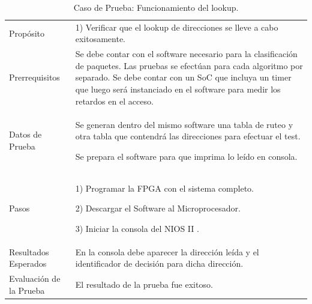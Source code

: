\begin{table}
	\begin{tabular}{|>{\columncolor[gray]{0.8}}l|p{11cm}|} \hline
\multicolumn{2}{|>{\columncolor[gray]{0.8}}l|}{\textbf{Caso de Prueba: Funcionamiento del LookUp }}\\ \hline
Propósito  & 1) Verificar que el lookup de direcciones se lleve a cabo exitosamente. 

\\ \hline
 Prerrequisitos  & Se debe contar con el software necesario para la clasificación de paquetes. Las pruebas se efectúan para cada algoritmo por separado. Se debe contar con un SoC que incluya un timer que luego será instanciado en el software para medir los retardos en el acceso.
 \\ \hline
 Datos de Prueba & Se generan dentro del mismo software una tabla de ruteo y otra tabla que contendrá las direcciones para efectuar el test. 

Se prepara el software para que imprima lo leído en consola. 
 \\ \hline
 Pasos & 1) Programar la FPGA con el sistema completo.

2) Descargar el Software al Microprocesador. 

3) Iniciar la consola del NIOS II .
\\ \hline
 Resultados Esperados & En la consola debe aparecer la dirección leída y el identificador de decisión para dicha dirección. \\ \hline
 Evaluación de la Prueba  & El resultado de la prueba fue exitoso.\\ \hline
	\end{tabular}
	\caption{Caso de Prueba: Funcionamiento del lookup.}
	\label{tab:retlook}
\end{table}



